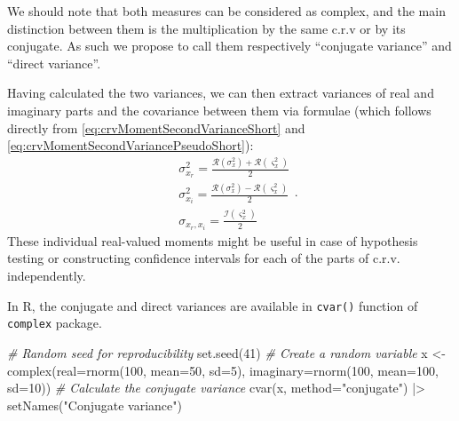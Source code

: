 \documentclass[
]{book}
\newenvironment{Shaded}{\begin{snugshade}}{\end{snugshade}}
\newcommand{\AttributeTok}[1]{\textcolor[rgb]{0.77,0.63,0.00}{#1}}
\newcommand{\CommentTok}[1]{\textcolor[rgb]{0.56,0.35,0.01}{\textit{#1}}}
\newcommand{\DecValTok}[1]{\textcolor[rgb]{0.00,0.00,0.81}{#1}}
\newcommand{\FunctionTok}[1]{\textcolor[rgb]{0.00,0.00,0.00}{#1}}
\newcommand{\NormalTok}[1]{#1}
\newcommand{\OtherTok}[1]{\textcolor[rgb]{0.56,0.35,0.01}{#1}}
\newcommand{\SpecialCharTok}[1]{\textcolor[rgb]{0.00,0.00,0.00}{#1}}
\newcommand{\StringTok}[1]{\textcolor[rgb]{0.31,0.60,0.02}{#1}}
\begin{document}
We should note that both measures can be considered as complex, and the main distinction between them is the multiplication by the same c.r.v or by its conjugate. As such we propose to call them respectively ``conjugate variance'' and ``direct variance''.

Having calculated the two variances, we can then extract variances of real and imaginary parts and the covariance between them via formulae (which follows directly from \eqref{eq:crvMomentSecondVarianceShort} and \eqref{eq:crvMomentSecondVariancePseudoShort}):
\begin{equation}
    \begin{aligned}
        & \sigma_{x_r}^2 = \frac{\mathcal{R}(\sigma^2_x) + \mathcal{R}(\varsigma^2_x)}{2} \\
        & \sigma_{x_i}^2 = \frac{\mathcal{R}(\sigma^2_x) - \mathcal{R}(\varsigma^2_x)}{2} \\
        & \sigma_{x_r,x_i} = \frac{\mathcal{I}(\varsigma^2_x)}{2}
    \end{aligned} .
    \label{eq:IndividualVariances}
\end{equation}
These individual real-valued moments might be useful in case of hypothesis testing or constructing confidence intervals for each of the parts of c.r.v. independently.

In R, the conjugate and direct variances are available in \texttt{cvar()} function of \texttt{complex} package.

\begin{Shaded}
\begin{Highlighting}[]
\CommentTok{\# Random seed for reproducibility}
\FunctionTok{set.seed}\NormalTok{(}\DecValTok{41}\NormalTok{)}
\CommentTok{\# Create a random variable}
\NormalTok{x }\OtherTok{\textless{}{-}} \FunctionTok{complex}\NormalTok{(}\AttributeTok{real=}\FunctionTok{rnorm}\NormalTok{(}\DecValTok{100}\NormalTok{, }\AttributeTok{mean=}\DecValTok{50}\NormalTok{, }\AttributeTok{sd=}\DecValTok{5}\NormalTok{),}
             \AttributeTok{imaginary=}\FunctionTok{rnorm}\NormalTok{(}\DecValTok{100}\NormalTok{, }\AttributeTok{mean=}\DecValTok{100}\NormalTok{, }\AttributeTok{sd=}\DecValTok{10}\NormalTok{))}
\CommentTok{\# Calculate the conjugate variance}
\FunctionTok{cvar}\NormalTok{(x, }\AttributeTok{method=}\StringTok{"conjugate"}\NormalTok{) }\SpecialCharTok{|\textgreater{}}
    \FunctionTok{setNames}\NormalTok{(}\StringTok{"Conjugate variance"}\NormalTok{)}
\end{Highlighting}
\end{Shaded}
\end{document}
